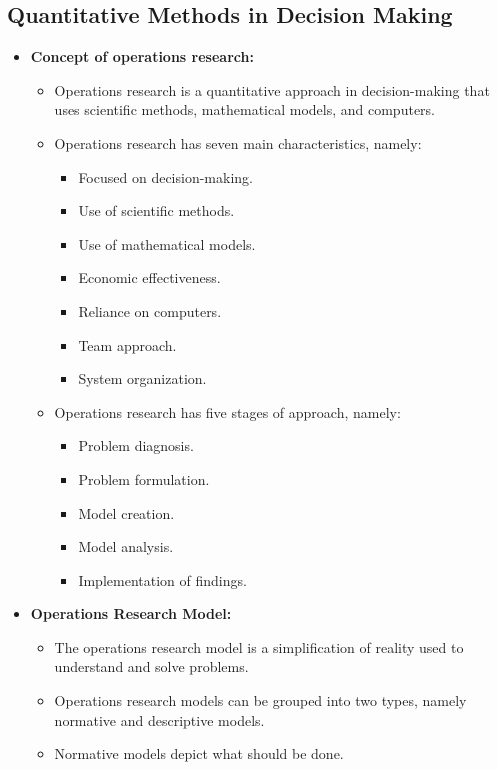 \documentclass[12pt,titlepage]{article}
\begin{document}
\subsection{Quantitative Methods in Decision Making}
\begin{itemize}
    \item \textbf{Concept of operations research:}
    \begin{itemize}
        \item Operations research is a quantitative approach in decision-making that uses scientific methods, mathematical models, and computers. 
        \item Operations research has seven main characteristics, namely:
        \begin{itemize}
            \item Focused on decision-making.
            \item Use of scientific methods.
            \item Use of mathematical models.
            \item Economic effectiveness.
            \item Reliance on computers.
            \item Team approach.
            \item System organization.
        \end{itemize}
        \item Operations research has five stages of approach, namely:
        \begin{itemize}
            \item Problem diagnosis.
            \item Problem formulation.
            \item Model creation.
            \item Model analysis.
            \item Implementation of findings.
        \end{itemize}
    \end{itemize}
    \item \textbf{Operations Research Model:}
    \begin{itemize}
        \item The operations research model is a simplification of reality used to understand and solve problems.
        \item Operations research models can be grouped into two types, namely normative and descriptive models.
        \item Normative models depict what should be done.

\end{itemize}
\end{itemize}
\end{document}
